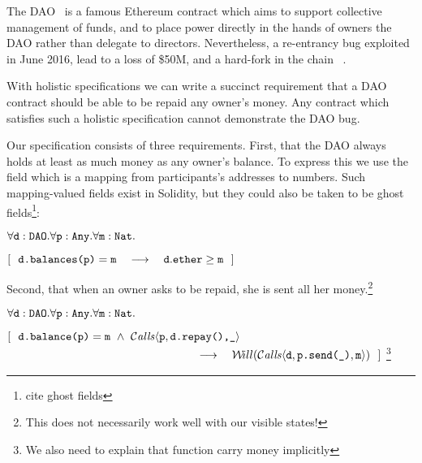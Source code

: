 The DAO~\cite{DAO}  is a famous Ethereum contract  which aims  to support
collective management of funds,  and to place power directly in the hands of owners the DAO
rather than delegate to directors.
Nevertheless, a re-entrancy bug   exploited in June 2016, lead  to a loss of   \$50M, and
a hard-fork in the  chain ~\cite{DaoBug}.

With holistic specifications  we can  write a succinct requirement that a
DAO contract  should be able to be repaid any owner's money.
Any contract which satisfies such a holistic specification cannot demonstrate the DAO bug.
 
Our specification consists of three requirements.
First, that the DAO always holds at least as 
much money as any owner's balance. To express this we use 
the field  which is a mapping from participants's addresses to 
numbers. Such mapping-valued fields exist in Solidity, but they could
also be taken to be ghost fields\footnote{cite ghost fields}:

\vspace{.1cm}

\noindent
 \strut \hspace{0.5cm} $\forall {\mbox{\tt{d}}}:{\mbox{\tt{DAO}}}.\forall {\mbox{\tt{p}}}:{\mbox{\tt{Any}}}.\forall{\mbox{\tt{m}}}:{\mbox{\tt{Nat}}}.$\\
\strut \hspace{0.5cm} $[\ \ \prg{d.balances(p)}=\prg{m}  \ \ \  \longrightarrow  \ \ \ \prg{d}.\prg{ether}\geq \prg{m} \ \ ] $

\noindent
Second, that when an owner asks to be repaid, she is sent all her money.\footnote{This
does not necessarily work well with our visible states!}
\vspace{.1cm}

\noindent
 \strut \hspace{0.5cm} $\forall {\mbox{\tt{d}}}:{\mbox{\tt{DAO}}}.\forall {\mbox{\tt{p}}}:{\mbox{\tt{Any}}}.\forall{\mbox{\tt{m}}}:{\mbox{\tt{Nat}}}.$\\
\strut \hspace{0.5cm} $[\ \ {\mbox{\tt{d.balance(p)}}}={\mbox{\tt{m}}}
 \ \wedge \ {\mathcal{C}}\textrm{\textit{alls}}\langle {\mbox{\tt{p}}},{\mbox{\tt{d.repay(),\_}}}\rangle  $\\
 $\strut \hspace{5.5cm}   \ \ \  \longrightarrow  \ \ \  \Future{\Calls{\prg{d},\prg{p.send(\_)},\prg{m}}}\ \ ] $ \footnote{We also need to explain that function carry money implicitly}

\vspace{.1cm}

